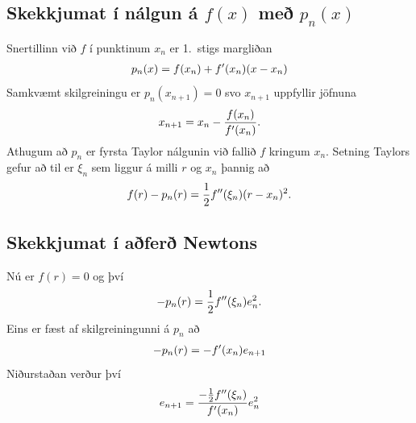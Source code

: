 \documentclass[A4paper,10pt,icelandic]{sphinxmanual}
\begin{document}
\subsection{Skekkjumat í nálgun á \(f(x)\) með \(p_n(x)\)}
\label{kafli02:id6}
Snertillinn við \(f\) í punktinum \(x_n\) er 1. stigs margliðan
\begin{gather}
\begin{split}p_n(x) = f(x_n) + f'(x_n)(x-x_n)\end{split}\notag
\end{gather}
Samkvæmt skilgreiningu er \(p_n(x_{n+1}) = 0\) svo \(x_{n+1}\)
uppfyllir jöfnuna
\begin{gather}
\begin{split}x_{n+1} = x_n - \frac{f(x_n)}{f'(x_n)}.\end{split}\notag
\end{gather}
Athugum að \(p_n\) er fyrsta Taylor nálgunin við fallið \(f\)
kringum \(x_n\). Setning Taylors gefur að til er \(\xi_n\) sem
liggur á milli \(r\) og \(x_n\) þannig að
\begin{gather}
\begin{split}f(r) - p_n(r) = \frac{1}{2}f''(\xi_n)(r-x_n)^2.\end{split}\notag
\end{gather}

\subsection{Skekkjumat í aðferð Newtons}
\label{kafli02:skekkjumat-i-afer-newtons}
Nú er \(f(r) = 0\) og því
\begin{gather}
\begin{split}-p_n(r) = \frac{1}{2}f''(\xi_n)e_n^2.\end{split}\notag
\end{gather}
Eins er fæst af skilgreiningunni á \(p_n\) að
\begin{gather}
\begin{split}-p_n(r) = -f'(x_n)e_{n+1}\end{split}\notag
\end{gather}
Niðurstaðan verður því
\begin{gather}
\begin{split}e_{n+1} = \frac{-\frac{1}{2}f''(\xi_n)}
        {f'(x_n)}e_n^2\end{split}\notag
\end{gather}
\end{document}
